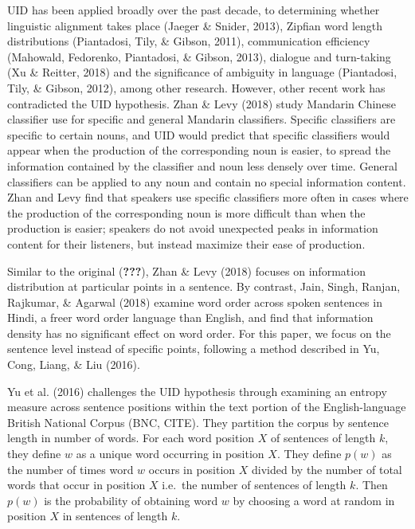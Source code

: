 \documentclass[10pt, letterpaper]{article}
\begin{document}
UID has been applied broadly over the past decade, to determining
whether linguistic alignment takes place (Jaeger \& Snider, 2013),
Zipfian word length distributions (Piantadosi, Tily, \& Gibson, 2011),
communication efficiency (Mahowald, Fedorenko, Piantadosi, \& Gibson,
2013), dialogue and turn-taking (Xu \& Reitter, 2018) and the
significance of ambiguity in language (Piantadosi, Tily, \& Gibson,
2012), among other research. However, other recent work has contradicted
the UID hypothesis. Zhan \& Levy (2018) study Mandarin Chinese
classifier use for specific and general Mandarin classifiers. Specific
classifiers are specific to certain nouns, and UID would predict that
specific classifiers would appear when the production of the
corresponding noun is easier, to spread the information contained by the
classifier and noun less densely over time. General classifiers can be
applied to any noun and contain no special information content. Zhan and
Levy find that speakers use specific classifiers more often in cases
where the production of the corresponding noun is more difficult than
when the production is easier; speakers do not avoid unexpected peaks in
information content for their listeners, but instead maximize their ease
of production.

Similar to the original ({\textbf{???}}), Zhan \& Levy (2018) focuses on
information distribution at particular points in a sentence. By
contrast, Jain, Singh, Ranjan, Rajkumar, \& Agarwal (2018) examine word
order across spoken sentences in Hindi, a freer word order language than
English, and find that information density has no significant effect on
word order. For this paper, we focus on the sentence level instead of
specific points, following a method described in Yu, Cong, Liang, \& Liu
(2016).

Yu et al. (2016) challenges the UID hypothesis through examining an
entropy measure across sentence positions within the text portion of the
English-language British National Corpus (BNC, CITE). They partition the
corpus by sentence length in number of words. For each word position
\(X\) of sentences of length \(k\), they define \(w\) as a unique word
occurring in position \(X\). They define \(p(w)\) as the number of times
word \(w\) occurs in position \(X\) divided by the number of total words
that occur in position \(X\) i.e.~the number of sentences of length
\(k\). Then \(p(w)\) is the probability of obtaining word \(w\) by
choosing a word at random in position \(X\) in sentences of length
\(k\).
\end{document}
